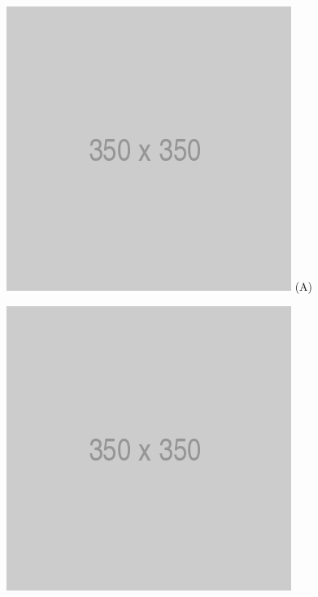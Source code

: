 \begin{figure}[htp]
\centering
\begin{minipage}{0.4\textwidth}
  \centering
  \includegraphics[width=\linewidth]{images/placeholder.png}
  (A)
\end{minipage}
\begin{minipage}{0.4\textwidth}
  \centering
  \includegraphics[width=\linewidth]{images/placeholder.png}

\end{minipage}
\end{figure}
